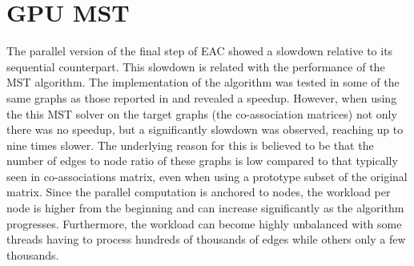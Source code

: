 \documentclass[10pt,a4paper,twoside]{report}
\begin{document}
\section{GPU MST}

The parallel version of the final step of EAC showed a slowdown relative to its sequential counterpart.
This slowdown is related with the performance of the MST algorithm.
The implementation of the algorithm was tested in some of the same graphs as those reported in \cite{Sousa2015} and revealed a speedup.
However, when using the this MST solver on the target graphs (the co-association matrices) not only there was no speedup, but a significantly slowdown was observed, reaching up to nine times slower.
The underlying reason for this is believed to be that the number of edges to node ratio of these graphs is low compared to that typically seen in co-associations matrix, even when using a prototype subset of the original matrix.
Since the parallel computation is anchored to nodes, the workload per node is higher from the beginning and can increase significantly as the algorithm progresses.
Furthermore, the workload can become highly unbalanced with some threads having to process hundreds of thousands of edges while others only a few thousands.





%
%
%
%
%
%
%
%

%
\end{document}
